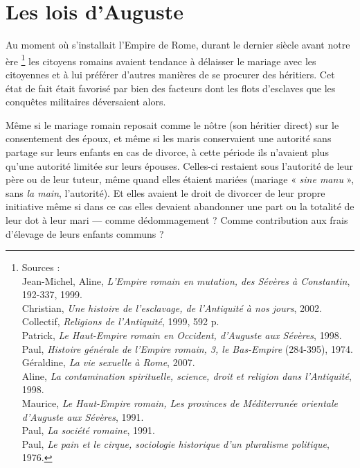 

\chapter{Les lois d'Auguste}

 Au moment où s'installait l'Empire de Rome, durant le dernier siècle avant notre ère%
\footnote{Sources :\\
 Jean-Michel,  Aline, \emph{L'Empire romain en mutation, des Sévères à Constantin}, 192-337, 1999.\\
 Christian, \emph{Une histoire de l'esclavage, de l'Antiquité à nos jours}, 2002.\\
Collectif, \emph{Religions de l'Antiquité}, 1999, 592 p.\\
 Patrick, \emph{Le Haut-Empire romain en Occident, d'Auguste aux Sévères}, 1998.\\
 Paul, \emph{Histoire générale de l'Empire romain, 3, le Bas-Empire} (284-395), 1974.\\
 Géraldine, \emph{La vie sexuelle à Rome}, 2007.\\
 Aline, \emph{La contamination spirituelle, science, droit et religion dans l'Antiquité}, 1998.\\
 Maurice, \emph{Le Haut-Empire romain, Les provinces de Méditerranée orientale d'Auguste aux Sévères}, 1991.\\
 Paul, \emph{La société romaine}, 1991.\\
 Paul, \emph{Le pain et le cirque, sociologie historique d'un pluralisme politique}, 1976.}
les citoyens romains avaient tendance à délaisser le mariage avec les citoyennes et à lui préférer d'autres manières de se procurer des héritiers. Cet état de fait était favorisé par bien des facteurs dont les flots d'esclaves que les conquêtes militaires déversaient alors. 

 Même si le mariage romain reposait comme le nôtre (son héritier direct) sur le consentement des époux, et même si les maris conservaient une autorité sans partage sur leurs enfants en cas de divorce, à cette période ils n'avaient plus qu'une autorité limitée sur leurs épouses. Celles-ci restaient sous l'autorité de leur père ou de leur tuteur, même quand elles étaient mariées (mariage « \emph{sine manu} », sans \emph{la main}, l'autorité). Et elles avaient le droit de divorcer de leur propre initiative même si dans ce cas elles devaient abandonner une part ou la totalité de leur dot à leur mari --- comme dédommagement ? Comme contribution aux frais d'élevage de leurs enfants communs ?

